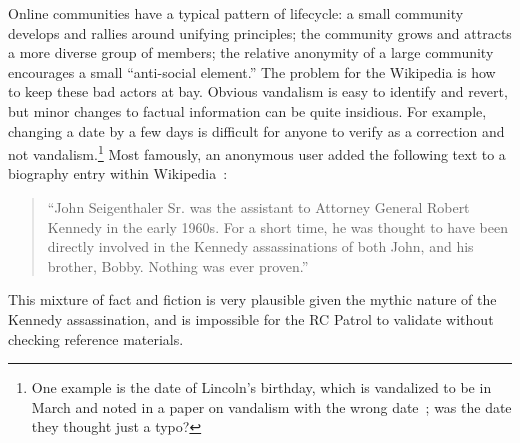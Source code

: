 Online communities have a typical pattern of lifecycle:
a small community develops and rallies around unifying principles;
the community grows and attracts a more diverse group of members;
the relative anonymity of a large community encourages
a small ``anti-social element.''
The problem for the Wikipedia is how to keep these bad actors at bay.
Obvious vandalism is easy to identify and revert,
but minor changes to factual information can be quite insidious.
For example, changing a date by a few days is difficult for anyone
to verify as a correction and not vandalism.\footnote{
One example is the date of Lincoln's birthday,
which is vandalized to be in March  and noted in a paper on vandalism with the wrong
date~\cite{Chin2010};
was the date they thought just a typo?}
Most famously, an anonymous user added the following text to a biography entry
within Wikipedia~\cite{Seigenthaler05,NewYorkTimes05a,NewYorkTimes05b}:
\begin{quote}
``John Seigenthaler Sr. was the assistant to
Attorney General Robert Kennedy in the early 1960s.
For a short time, he was thought to have been directly involved
in the Kennedy assassinations of both John, and his brother, Bobby.
Nothing was ever proven.''
\end{quote}
This mixture of fact and fiction is very plausible given the
mythic nature of the Kennedy assassination, and is impossible
for the RC Patrol to validate without checking reference materials.



